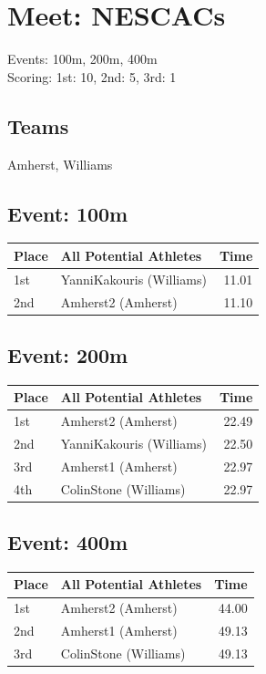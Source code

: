 \documentclass[11pt]{article}
\begin{document}
\section*{Meet: NESCACs}

Events: 100m, 200m, 400m\\

Scoring: 1st: 10, 2nd: 5, 3rd: 1\\

\subsection*{Teams}
Amherst, Williams

\subsection*{Event: 100m}
\begin{tabularx}{\linewidth}{lXr}
\toprule
Place & All Potential Athletes & Time \\
\midrule
1st & YanniKakouris (Williams) & 11.01 \\
2nd & Amherst2 (Amherst) & 11.10 \\
\bottomrule
\end{tabularx}

\subsection*{Event: 200m}
\begin{tabularx}{\linewidth}{lXr}
\toprule
Place & All Potential Athletes & Time \\
\midrule
1st & Amherst2 (Amherst) & 22.49 \\
2nd & YanniKakouris (Williams) & 22.50 \\
3rd & Amherst1 (Amherst) & 22.97 \\
4th & ColinStone (Williams) & 22.97 \\
\bottomrule
\end{tabularx}

\subsection*{Event: 400m}
\begin{tabularx}{\linewidth}{lXr}
\toprule
Place & All Potential Athletes & Time \\
\midrule
1st & Amherst2 (Amherst) & 44.00 \\
2nd & Amherst1 (Amherst) & 49.13 \\
3rd & ColinStone (Williams) & 49.13 \\
\bottomrule
\end{tabularx}
\end{document}
